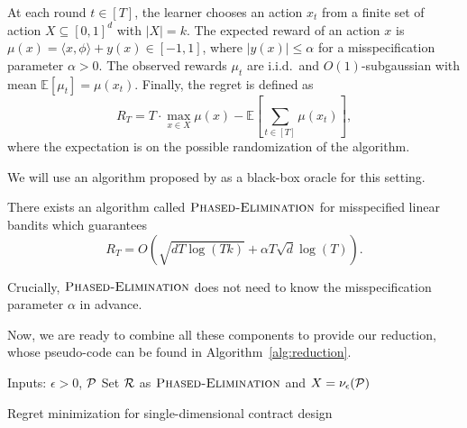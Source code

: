 \begin{definition}\label{def:MLB}
    At each round $t \in [T]$, the learner chooses an action $x_t$ from a finite set of action $X\subseteq [0,1]^d$ with $|X|=k$. The expected reward of an action $x$ is $\mu(x)=\langle x,\phi\rangle+ y(x) \in [-1,1]$, where $ |y(x)|\le\alpha$ for a misspecification parameter $\alpha>0$. The observed rewards $\mu_t$ are i.i.d.~and $O(1)$-subgaussian with mean $\mathbb{E}[\mu_t]=\mu(x_t)$.
    Finally, the regret is defined as
    \[
    R_T= T \cdot\max_{x\in X} \mu(x)- \mathbb{E}\left[\sum_{t \in [T] }  \mu(x_t)\right],
    \]
    where the expectation is on the possible randomization of the algorithm.
\end{definition}


We will use an algorithm proposed by \citet{lattimore2020learning} as a black-box oracle for this setting.

\begin{theorem}\label{thm:misspecified}
    There exists an algorithm called $\textsc{Phased-Elimination}$ for misspecified linear bandits which guarantees
    \[
        R_T=O\left(\sqrt{dT\log(Tk)}+ \alpha T\sqrt{d} \log(T)\right). 
    \]
\end{theorem}
Crucially, $\textsc{Phased-Elimination}$ does not need to know the misspecification parameter $\alpha$ in advance.

Now, we are ready to combine all these components to provide our reduction, whose pseudo-code can be found in Algorithm~\ref{alg:reduction}.
%
\setlength{\algomargin}{1.5em}
\begin{algorithm}[t]
    \nl Inputs: $\epsilon>0$, $\mathcal{P}$\;
    \nl Set $\mathcal{R}$ as $\textsc{Phased-Elimination}$ and $X=\nu_\epsilon(\mathcal{P})$\;
    \caption{Regret minimization for single-dimensional contract design}\label{alg:reduction}
\end{algorithm}

% 
% 

